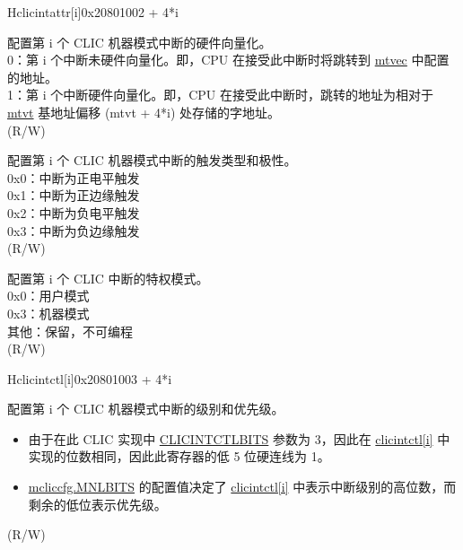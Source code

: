 \begin{register}{H}{{clicintattr[i]}}{0x20801002 + 4*i}\label{regdesc:MCLICINTATTR_REG_i}
%
%
%
%
\regnewline%
\begin{regdesc}
\begin{reglist}
\label{fielddesc:MCLICINTATTR_i_SHV}\item [{SHV}] 配置第 i 个 CLIC 机器模式中断的硬件向量化。 \\
0：第 i 个中断未硬件向量化。即，CPU 在接受此中断时将跳转到 \hyperref[fielddesc:MTVECBASE]{mtvec} 中配置的地址。 \\
1：第 i 个中断硬件向量化。即，CPU 在接受此中断时，跳转的地址为相对于 \hyperref[fielddesc:MTVTBASE]{mtvt} 基地址偏移 (mtvt + 4*i) 处存储的字地址。 \\
(R/W)
\label{fielddesc:MCLICINTATTR_i_TRIG}\item [{TRIG}] 配置第 i 个 CLIC 机器模式中断的触发类型和极性。 \\
0x0：中断为正电平触发 \\
0x1：中断为正边缘触发 \\
0x2：中断为负电平触发 \\
0x3：中断为负边缘触发 \\
(R/W)
\label{fielddesc:MCLICINTATTR_i_MODE}\item [{MODE}] 配置第 i 个 CLIC 中断的特权模式。 \\
0x0：用户模式\\
0x3：机器模式\\
其他：保留，不可编程\\
(R/W)
\end{reglist}
\end{regdesc}
\end{register}

\begin{register}{H}{{clicintctl[i]}}{0x20801003 + 4*i}\label{regdesc:MCLICINTCTL_REG_i}
%
%
\regnewline%
\begin{regdesc}
\begin{reglist}
\label{fielddesc:MCLICINTCTL_i}\item [{CTL[i]}] 配置第 i 个 CLIC 机器模式中断的级别和优先级。 \\
\begin{itemize}
    \item 由于在此 CLIC 实现中 \hyperref[fielddesc:CLICINFO_CLICINTCTLBITS]{CLICINTCTLBITS} 参数为 3，因此在 \hyperref[regdesc:MCLICINTCTL_REG_i]{clicintctl[i]} 中实现的位数相同，因此此寄存器的低 5 位硬连线为 1。 \\
    \item \hyperref[fielddesc:MCLICCFG_MNLBITS]{mcliccfg.MNLBITS} 的配置值决定了 \hyperref[regdesc:MCLICINTCTL_REG_i]{clicintctl[i]} 中表示中断级别的高位数，而剩余的低位表示优先级。\\
\end{itemize}
(R/W)
\end{reglist}
\end{regdesc}
\end{register}
